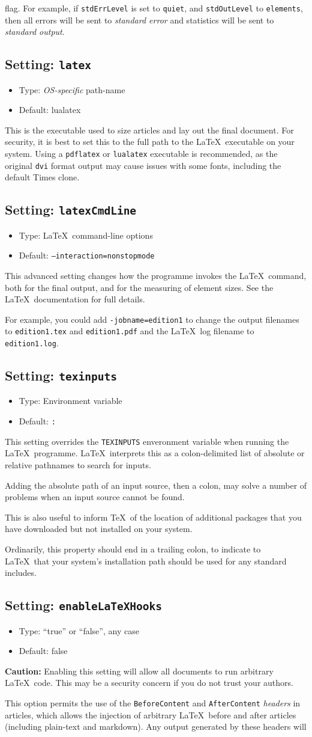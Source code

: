 \documentclass[a4paper,DIV=11]{scrartcl}
\newcommand{\property}[5]{
  \subsection{#1: \texttt{#2}}
  \begin{itemize}
  \item Type: #3
  \item Default: #4
  \end{itemize}
  #5
}
\newcommand{\setting}{\property{Setting}}
\begin{document}
\begin{multicols}{2}
{  flag. For example, if \texttt{stdErrLevel} is set to
  \texttt{quiet}, and \texttt{stdOutLevel} to \texttt{elements}, then
  all errors will be sent to \textit{standard error} and statistics
  will be sent to \textit{standard output}.
}
\setting{latex}{\textit{OS-specific} path-name}{lualatex}{This is the executable used to
  size articles and lay out the final document. For security, it is
  best to set this to the full path to the \LaTeX\ executable on your
  system. Using a \texttt{pdflatex} or \texttt{lualatex} executable is
  recommended, as the original \texttt{dvi} format output may cause
  issues with some fonts, including the default Times clone.}
\setting{latexCmdLine}{\LaTeX\ command-line options}{\texttt{--interaction=nonstopmode}}{
  This advanced setting changes how the programme invokes the
  \LaTeX\ command, both for the final output, and for the measuring of
  element sizes. See the \LaTeX\ documentation for full details.\par
  For example, you could add \texttt{-jobname=edition1} to change the
  output filenames to \texttt{edition1.tex} and \texttt{edition1.pdf} and
  the \LaTeX\ log filename to \texttt{edition1.log}.
}
\setting{texinputs}{Environment variable}{\texttt{:}}{This setting
  overrides the \texttt{TEXINPUTS} enveronment variable when running
  the \LaTeX\ programme. \LaTeX\ interprets this as a colon-delimited
  list of absolute or relative pathnames to search for inputs.\par
  Adding the absolute path of an input source, then a colon, may solve a number of
  problems when an input source cannot be found.\par
  This is also useful to inform \TeX\ of the location of additional
  packages that you have downloaded but not installed on your system.\par
  Ordinarily, this property should end in a trailing colon, to
  indicate to \LaTeX\ that your system's installation path should be
  used for any standard includes.\par
}
\setting{enableLaTeXHooks}{``true'' or ``false'', any case}{false}{
  \textbf{Caution:} Enabling this setting will allow all documents to
  run arbitrary \LaTeX\ code. This may be a security concern if you do
  not trust your authors.\par
  This option permits the use of the \texttt{BeforeContent} and
  \texttt{AfterContent} \textit{headers} in articles, which allows the
  injection of arbitrary \LaTeX\ before and after articles (including
  plain-text and markdown). Any output generated by these headers will
}
\end{multicols}
\end{document}
